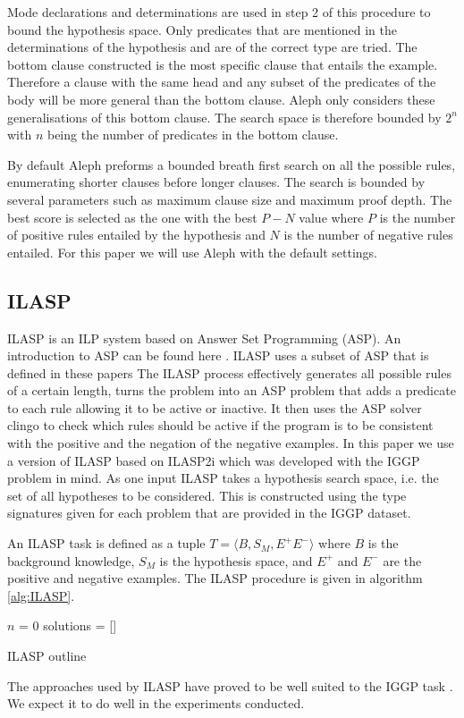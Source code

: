 Mode declarations and determinations are used in step 2 of this procedure to bound the hypothesis space. Only predicates that are mentioned in the determinations of the hypothesis and are of the correct type are tried. The bottom clause constructed is the most specific clause that entails the example. Therefore a clause with the same head and any subset of the predicates of the body will be more general than the bottom clause. Aleph only considers these generalisations of this bottom clause. The search space is therefore bounded by $2^n$ with $n$ being the number of predicates in the bottom clause.

By default Aleph preforms a bounded breath first search on all the possible rules, enumerating shorter clauses before longer clauses. The search is bounded by several parameters such as maximum clause size and maximum proof depth. The best score is selected as the one with the best $P - N$ value where $P$ is the number of positive rules entailed by the hypothesis and $N$ is the number of negative rules entailed. For this paper we will use Aleph with the default settings.

\subsection{ILASP}

ILASP is an ILP system based on Answer Set Programming (ASP). An introduction to ASP can be found here \cite{Corapi/ASP}. ILASP uses a subset of ASP that is defined in these papers\cite{ILASP-Manuel}\cite{MarkLaw/OG-ILASP}\cite{MarkLaw/Thesis} The ILASP process effectively generates all possible rules of a certain length, turns the problem into an ASP problem that adds a predicate to each rule allowing it to be active or inactive. It then uses the ASP solver clingo\cite{Clingo}  to check which rules should be active if the program is to be consistent with the positive and the negation of the negative examples\cite{MarkLaw/OG-ILASP}\cite{MarkLaw/Thesis}. In this paper we use a version of ILASP based on ILASP2i\cite{MarkLaw/ILASP2i} which was developed with the IGGP problem in mind\cite{Cropper/IGGP}. As one input ILASP takes a hypothesis search space, i.e. the set of all hypotheses to be considered. This is constructed using the type signatures given for each problem that are provided in the IGGP dataset.

An ILASP task is defined as a tuple $T = \langle B,S_M,E^+E^-\rangle$ where $B$ is the background knowledge, $S_M$ is the hypothesis space, and $E^+$ and $E^-$ are the positive and negative examples. The ILASP procedure is given in algorithm \ref{alg:ILASP}.
\begin{algorithm}[H]\label{alg:ILASP}
    \SetAlgoLined
    $n$ = 0\;
    solutions = []\;
    \caption{ILASP outline}
\end{algorithm}

The approaches used by ILASP have proved to be well suited to the IGGP task \cite{Cropper/IGGP}. We expect it to do well in the experiments conducted.
